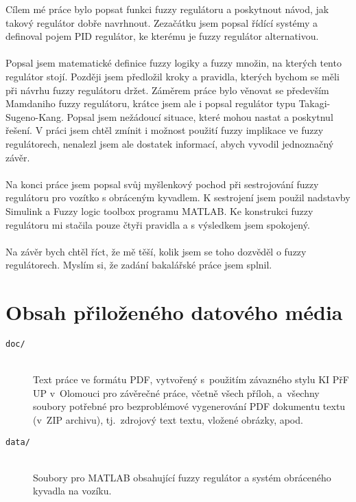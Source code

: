 \documentclass[
  program=inf,
  figures,
  tables,
  glossaries,
  index
]{kidiplom}
\begin{document}
\begin{kiconclusions}
Cílem mé práce bylo popsat funkci fuzzy regulátoru a poskytnout návod, jak takový regulátor dobře navrhnout. Zezačátku jsem popsal řídící systémy a definoval pojem PID regulátor, ke kterému je fuzzy regulátor alternativou. \\ \\
Popsal jsem matematické definice fuzzy logiky a fuzzy množin, na kterých tento regulátor stojí. Později jsem předložil kroky a pravidla, kterých bychom se měli při návrhu fuzzy regulátoru držet. Záměrem práce bylo věnovat se především Mamdaniho fuzzy regulátoru, krátce jsem ale i popsal regulátor typu Takagi-Sugeno-Kang. Popsal jsem nežádoucí situace, které mohou nastat a poskytnul řešení. V práci jsem chtěl zmínit i možnost použití fuzzy implikace ve fuzzy regulátorech, nenalezl jsem ale dostatek informací, abych vyvodil jednoznačný závěr.\\ \\
Na konci práce jsem popsal svůj myšlenkový pochod při sestrojování fuzzy regulátoru pro vozítko s obráceným kyvadlem. K sestrojení jsem použil nadstavby Simulink a Fuzzy logic toolbox programu MATLAB. Ke konstrukci fuzzy regulátoru mi stačila pouze čtyři pravidla a s výsledkem jsem spokojený. \\ \\
Na závěr bych chtěl říct, že mě těší, kolik jsem se toho dozvěděl o fuzzy regulátorech. Myslím si, že zadání bakalářské práce jsem splnil.
\end{kiconclusions}
\newpage




\section{Obsah přiloženého datového média} \label{sec:ObsahMedia}
\begin{description}


\item[\texttt{doc/}] \hfill \\
  Text práce ve formátu PDF, vytvořený s~použitím závazného stylu KI
  PřF UP v~Olomouci pro závěrečné práce, včetně všech příloh,
  a~všechny soubory potřebné pro bezproblémové vygenerování PDF
  dokumentu textu (v~ZIP archivu), tj.~zdrojový text textu, vložené
  obrázky, apod.


\item[\texttt{data/}] \hfill \\
  Soubory pro MATLAB obsahující fuzzy regulátor a systém obráceného kyvadla na vozíku.

\end{description}
\newpage
\end{document}
